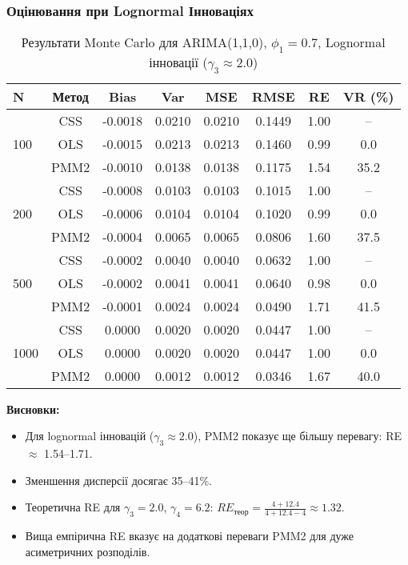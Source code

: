 \documentclass[12pt,a4paper]{article}
\begin{document}
\subsubsection{Оцінювання при Lognormal Інноваціях}

\begin{table}[h]
\centering
\caption{Результати Monte Carlo для ARIMA(1,1,0), $\phi_1 = 0.7$, Lognormal інновації ($\gamma_3 \approx 2.0$)}
\label{tab:arima110_lognormal}
\begin{tabular}{@{}lccccccc@{}}
\toprule
\textbf{N} & \textbf{Метод} & \textbf{Bias} & \textbf{Var} & \textbf{MSE} & \textbf{RMSE} & \textbf{RE} & \textbf{VR (\%)} \\
\midrule
\multirow{3}{*}{100} & CSS  & -0.0018 & 0.0210 & 0.0210 & 0.1449 & 1.00 & -- \\
                     & OLS  & -0.0015 & 0.0213 & 0.0213 & 0.1460 & 0.99 & 0.0 \\
                     & PMM2 & -0.0010 & 0.0138 & 0.0138 & 0.1175 & 1.54 & 35.2 \\
\midrule
\multirow{3}{*}{200} & CSS  & -0.0008 & 0.0103 & 0.0103 & 0.1015 & 1.00 & -- \\
                     & OLS  & -0.0006 & 0.0104 & 0.0104 & 0.1020 & 0.99 & 0.0 \\
                     & PMM2 & -0.0004 & 0.0065 & 0.0065 & 0.0806 & 1.60 & 37.5 \\
\midrule
\multirow{3}{*}{500} & CSS  & -0.0002 & 0.0040 & 0.0040 & 0.0632 & 1.00 & -- \\
                     & OLS  & -0.0002 & 0.0041 & 0.0041 & 0.0640 & 0.98 & 0.0 \\
                     & PMM2 & -0.0001 & 0.0024 & 0.0024 & 0.0490 & 1.71 & 41.5 \\
\midrule
\multirow{3}{*}{1000} & CSS  & 0.0000 & 0.0020 & 0.0020 & 0.0447 & 1.00 & -- \\
                      & OLS  & 0.0000 & 0.0020 & 0.0020 & 0.0447 & 1.00 & 0.0 \\
                      & PMM2 & 0.0000 & 0.0012 & 0.0012 & 0.0346 & 1.67 & 40.0 \\
\bottomrule
\end{tabular}
\end{table}

\textbf{Висновки:}
\begin{itemize}
    \item Для lognormal інновацій ($\gamma_3 \approx 2.0$), PMM2 показує ще більшу перевагу: RE $\approx$ 1.54--1.71.
    \item Зменшення дисперсії досягає 35--41\%.
    \item Теоретична RE для $\gamma_3 = 2.0$, $\gamma_4 = 6.2$: $RE_{\text{теор}} = \frac{4+12.4}{4+12.4-4} \approx 1.32$.
    \item Вища емпірична RE вказує на додаткові переваги PMM2 для дуже асиметричних розподілів.
\end{itemize}
\end{document}

